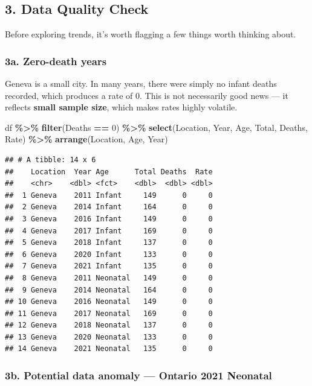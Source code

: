 \documentclass[
]{article}
\newenvironment{Shaded}{\begin{snugshade}}{\end{snugshade}}
\newcommand{\DecValTok}[1]{\textcolor[rgb]{0.00,0.00,0.81}{#1}}
\newcommand{\FunctionTok}[1]{\textcolor[rgb]{0.13,0.29,0.53}{\textbf{#1}}}
\newcommand{\NormalTok}[1]{#1}
\newcommand{\SpecialCharTok}[1]{\textcolor[rgb]{0.81,0.36,0.00}{\textbf{#1}}}
\begin{document}
\subsection{3. Data Quality Check}\label{data-quality-check}

Before exploring trends, it's worth flagging a few things worth thinking
about.

\subsubsection{3a. Zero-death years}\label{a.-zero-death-years}

Geneva is a small city. In many years, there were simply no infant
deaths recorded, which produces a rate of 0. This is not necessarily
good news --- it reflects \textbf{small sample size}, which makes rates
highly volatile.

\begin{Shaded}
\begin{Highlighting}[]
\NormalTok{df }\SpecialCharTok{\%\textgreater{}\%}
  \FunctionTok{filter}\NormalTok{(Deaths }\SpecialCharTok{==} \DecValTok{0}\NormalTok{) }\SpecialCharTok{\%\textgreater{}\%}
  \FunctionTok{select}\NormalTok{(Location, Year, Age, Total, Deaths, Rate) }\SpecialCharTok{\%\textgreater{}\%}
  \FunctionTok{arrange}\NormalTok{(Location, Age, Year)}
\end{Highlighting}
\end{Shaded}

\begin{verbatim}
## # A tibble: 14 x 6
##    Location  Year Age      Total Deaths  Rate
##    <chr>    <dbl> <fct>    <dbl>  <dbl> <dbl>
##  1 Geneva    2011 Infant     149      0     0
##  2 Geneva    2014 Infant     164      0     0
##  3 Geneva    2016 Infant     149      0     0
##  4 Geneva    2017 Infant     169      0     0
##  5 Geneva    2018 Infant     137      0     0
##  6 Geneva    2020 Infant     133      0     0
##  7 Geneva    2021 Infant     135      0     0
##  8 Geneva    2011 Neonatal   149      0     0
##  9 Geneva    2014 Neonatal   164      0     0
## 10 Geneva    2016 Neonatal   149      0     0
## 11 Geneva    2017 Neonatal   169      0     0
## 12 Geneva    2018 Neonatal   137      0     0
## 13 Geneva    2020 Neonatal   133      0     0
## 14 Geneva    2021 Neonatal   135      0     0
\end{verbatim}

\subsubsection{3b. Potential data anomaly --- Ontario 2021
Neonatal}\label{b.-potential-data-anomaly-ontario-2021-neonatal}
\end{document}
